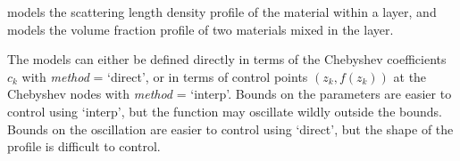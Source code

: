 \documentclass[letterpaper,10pt,english]{sphinxmanual}
\begin{document}
{\hyperref[api/cheby:refl1d.cheby.FreeformCheby]{}} models the scattering length density profile
of the material within a layer, and {\hyperref[api/cheby:refl1d.cheby.ChebyVF]{}} models the volume
fraction profile of two materials mixed in the layer.

The models can either be defined directly in terms of the Chebyshev
coefficients $c_k$ with \emph{method} = `direct', or in terms of control
points $(z_k, f(z_k))$ at the Chebyshev nodes {\hyperref[api/cheby:refl1d.cheby.cheby_points]{}}
with \emph{method} = `interp'.  Bounds on the parameters are easier to
control using `interp', but the function may oscillate wildly outside
the bounds.  Bounds on the oscillation are easier to control using
`direct', but the shape of the profile is difficult to control.
\end{document}
